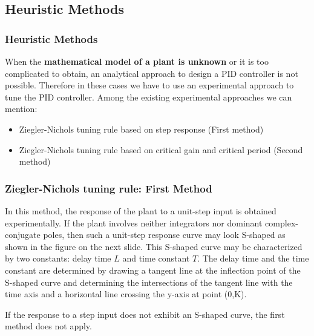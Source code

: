 \subsection{Heuristic Methods}

\begin{frame}
	\frametitle{Heuristic Methods}
	\justify
	When the \textbf{mathematical model of a plant is unknown} or it is too complicated to obtain, an analytical approach to design a PID controller is not possible. Therefore in these cases we have to use an experimental approach to tune the PID controller.  Among the existing experimental approaches we can mention:
	\begin{itemize}
		\item Ziegler-Nichols tuning rule based on step response (First method)
		\item Ziegler-Nichols tuning rule based on critical gain and critical period (Second method)
	\end{itemize}
\end{frame}

\begin{frame}
	\frametitle{Ziegler-Nichols tuning rule: First Method}
	\justify
	In this method, the response of the plant to a unit-step input is obtained experimentally. If the plant involves neither integrators nor dominant complex-conjugate poles, then such a unit-step response curve may look S-shaped as shown in the figure on the next slide. This S-shaped curve may be characterized by two constants: delay time $L$ and time constant $T$. The delay time and the time constant are determined by drawing a tangent line at the inflection point of the S-shaped curve and determining the intersections of the tangent line with the time axis and a horizontal line crossing the y-axis at point (0,K).
	\begin{alertblock}{}
		If the response to a step input does not exhibit an S-shaped curve, the first method does not apply.
	\end{alertblock}
\end{frame}

